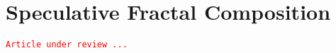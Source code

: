 \newpage


\label{fracdoc}

%

\chapter*{Speculative Fractal Composition}

\texttt{\textcolor{red}{\small Article under review ...}}